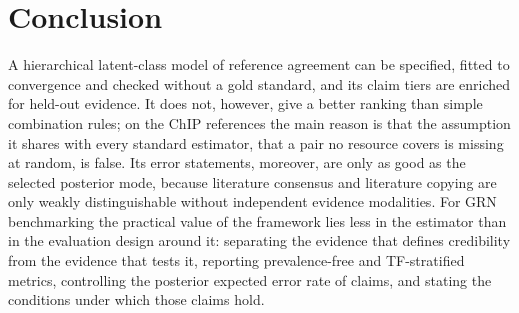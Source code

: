 \section{Conclusion}\label{sec:conclusion}

A hierarchical latent-class model of reference agreement can be specified, fitted to convergence and checked without a gold standard, and its claim tiers are enriched for held-out evidence.
It does not, however, give a better ranking than simple combination rules; on the ChIP references the main reason is that the assumption it shares with every standard estimator, that a pair no resource covers is missing at random, is false.
Its error statements, moreover, are only as good as the selected posterior mode, because literature consensus and literature copying are only weakly distinguishable without independent evidence modalities.
For GRN benchmarking the practical value of the framework lies less in the estimator than in the evaluation design around it: separating the evidence that defines credibility from the evidence that tests it, reporting prevalence-free and TF-stratified metrics, controlling the posterior expected error rate of claims, and stating the conditions under which those claims hold.
